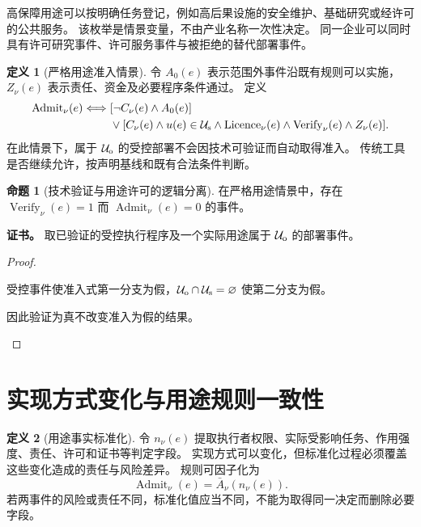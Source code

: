 \documentclass[UTF8,12pt,a4paper,openany,fontset=none,zihao=false]{ctexrep}
\theoremstyle{definition}
\newtheorem{definition}{定义}[chapter]
\newtheorem{proposition}{命题}[chapter]
\newenvironment{certificate}{\par\noindent\textbf{证书。}\ignorespaces}{\par}
\newcommand{\1}{\mathbf 1}
\begin{document}
高保障用途可以按明确任务登记，例如高后果设施的安全维护、基础研究或经许可的公共服务。
该枚举是情景变量，不由产业名称一次性决定。
同一企业可以同时具有许可研究事件、许可服务事件与被拒绝的替代部署事件。

\begin{definition}[严格用途准入情景]
\label{gov:strict-policy}
令 \(A_0(e)\) 表示范围外事件沿既有规则可以实施，\(Z_\nu(e)\) 表示责任、资金及必要程序条件通过。
定义
\[
\begin{aligned}
\operatorname{Admit}_\nu(e)\Longleftrightarrow{}&
[\neg C_\nu(e)\land A_0(e)]\\
&\lor[C_\nu(e)\land u(e)\in\mathcal U_{\rm s}
\land\operatorname{Licence}_\nu(e)
\land\operatorname{Verify}_\nu(e)\land Z_\nu(e)].
\end{aligned}
\]
在此情景下，属于 \(\mathcal U_{\rm o}\) 的受控部署不会因技术可验证而自动取得准入。
传统工具是否继续允许，按声明基线和既有合法条件判断。
\end{definition}

\begin{proposition}[技术验证与用途许可的逻辑分离]
\label{gov:verification-permission}
在严格用途情景中，存在 \(\operatorname{Verify}_\nu(e)=1\) 而 \(\operatorname{Admit}_\nu(e)=0\) 的事件。
\end{proposition}
\begin{certificate}
取已验证的受控执行程序及一个实际用途属于 \(\mathcal U_{\rm o}\) 的部署事件。
\end{certificate}
\begin{proof}
\begin{semanticsteps}
\item 受控事件使准入式第一分支为假，\(\mathcal U_{\rm o}\cap\mathcal U_{\rm s}=\varnothing\) 使第二分支为假。
\item 因此验证为真不改变准入为假的结果。
\end{semanticsteps}
\end{proof}

\section{实现方式变化与用途规则一致性}

\begin{definition}[用途事实标准化]
\label{gov:normalization}
令 \(n_\nu(e)\) 提取执行者权限、实际受影响任务、作用强度、责任、许可和证书等判定字段。
实现方式可以变化，但标准化过程必须覆盖这些变化造成的责任与风险差异。
规则可因子化为
\[
\operatorname{Admit}_\nu(e)=\bar A_\nu(n_\nu(e)).
\]
若两事件的风险或责任不同，标准化值应当不同，不能为取得同一决定而删除必要字段。
\end{definition}
\end{document}
